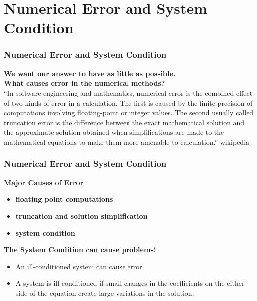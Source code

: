 \documentclass[fleqn]{beamer} %
\newcommand{\sectiontitleIV}{Numerical Error and System Condition}
\begin{document}
\section{\sectiontitleIV}

\begin{frame}[label=sectionIV] \small
  \frametitle{\sectiontitleIV}
\textbf{We want our answer to have as little  as possible.} \vspace{3mm}\\

		\textbf{What causes error in the numerical methods?} \\
			``In software engineering and mathematics, numerical error is the combined effect of two kinds of error in a calculation. The first is caused by the finite precision of computations involving floating-point or integer values. The second usually called truncation error is the difference between the exact mathematical solution and the approximate solution obtained when simplifications are made to the mathematical equations to make them more amenable to calculation.''-wikipedia\\
		

\end{frame}

\begin{frame}\small 
  \frametitle{\sectiontitleIV}
	\textbf{Major Causes of Error} \\
		\begin{itemize}
			\item \textbf{floating point computations} \vspace{3mm}\\
			\item \textbf{truncation and solution simplification} \vspace{3mm}\\
			\item \textbf{system condition} \vspace{3mm}\\
		\end{itemize}
		
		 \textbf{ The {\BL System Condition} can cause problems!} \\
\begin{itemize}
	 \item An {\PR ill-conditioned} system can cause error. \\
	
	\item A system is {\PR ill-conditioned} if small changes in the coefficients on the either side of the equation create large variations in the solution.\\
	\end{itemize}
\end{frame}
\end{document}
